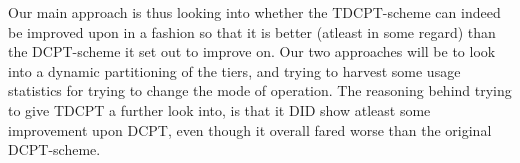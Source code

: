 Our main approach is thus looking into whether the TDCPT-scheme can indeed be
improved upon in a fashion so that it is better (atleast in some regard) than the
DCPT-scheme it set out to improve on. Our two approaches will be to look into a
dynamic partitioning of the tiers, and trying to harvest some usage statistics for
trying to change the mode of operation. The reasoning behind trying to give TDCPT
a further look into, is that it DID show atleast some improvement upon DCPT, even
though it overall fared worse than the original DCPT-scheme.
